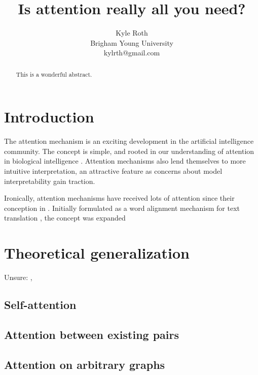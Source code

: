 \documentclass{article}
\title{Is attention really all you need?}
\author{
Kyle Roth\\
\affiliations
Brigham Young University\\
\emails
kylrth@gmail.com
}
\begin{document}
\maketitle

\tableofcontents

\vspace{30px}

\begin{abstract}
This is a wonderful abstract.
\end{abstract}

\section{Introduction}

The attention mechanism is an exciting development in the artificial intelligence community. The concept is simple, and rooted in our understanding of attention in biological intelligence \cite{glimpses,neuroscience-inspired}. Attention mechanisms also lend themselves to more intuitive interpretation, an attractive feature as concerns about model interpretability gain traction.

Ironically, attention mechanisms have received lots of attention since their conception in \citeyear{joint_align_translate}. Initially formulated as a word alignment mechanism for text translation \cite{joint_align_translate}, the concept was expanded

\section{Theoretical generalization}

\cite{joint_align_translate} \cite{listen_attend_spell}

Unsure: \cite{show_observe_tell}, \cite{draw}

\subsection{Self-attention}

\cite{self_attentive_embedding}

\subsection{Attention between existing pairs}

\cite{natural_language_inference}

\subsection{Attention on arbitrary graphs}
\end{document}
